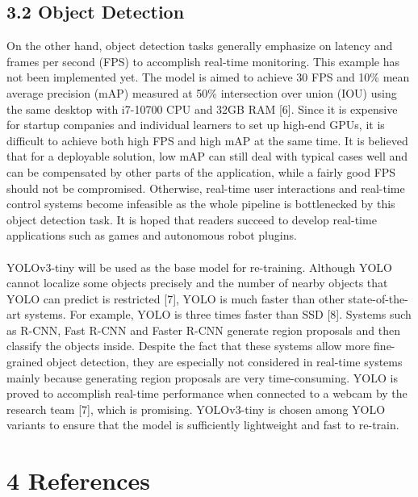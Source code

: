 \documentclass[11pt]{article}
\begin{document}
\subsection*{3.2 \hspace{10pt} Object Detection}
On the other hand, object detection tasks generally emphasize on latency and frames per second (FPS) to accomplish real-time monitoring. This example has not been implemented yet. The model is aimed to achieve 30 FPS and 10\% mean average precision (mAP) measured at 50\% intersection over union (IOU) using the same desktop with i7-10700 CPU and 32GB RAM [6]. Since it is expensive for startup companies and individual learners to set up high-end GPUs, it is difficult to achieve both high FPS and high mAP at the same time. It is believed that for a deployable solution, low mAP can still deal with typical cases well and can be compensated by other parts of the application, while a fairly good FPS should not be compromised. Otherwise, real-time user interactions and real-time control systems become infeasible as the whole pipeline is bottlenecked by this object detection task. It is hoped that readers succeed to develop real-time applications such as games and autonomous robot plugins. \\
\\
YOLOv3-tiny will be used as the base model for re-training. Although YOLO cannot localize some objects precisely and the number of nearby objects that YOLO can predict is restricted [7], YOLO is much faster than other state-of-the-art systems. For example, YOLO is three times faster than SSD [8]. Systems such as R-CNN, Fast R-CNN and Faster R-CNN generate region proposals and then classify the objects inside. Despite the fact that these systems allow more fine-grained object detection, they are especially not considered in real-time systems mainly because generating region proposals are very time-consuming. YOLO is proved to accomplish real-time performance when connected to a webcam by the research team [7], which is promising. YOLOv3-tiny is chosen among YOLO variants to ensure that the model is sufficiently lightweight and fast to re-train.

\section*{\large{4 \hspace{10pt} References}}
\end{document}
